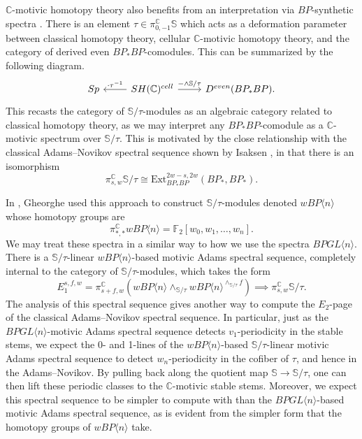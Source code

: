 \documentclass{amsart}
\theoremstyle{plain}
\numberwithin{theorem}{section}
\numberwithin{equation}{section}
\numberwithin{figure}{section}
\newcommand{\0}{\langle 0 \rangle }
\begin{document}
$\mathbb{C}$-motivic homotopy theory also benefits from an interpretation via $BP$-synthetic spectra \cite{Pst23}. There is an element $\tau \in \pi^{\mathbb{C}}_{0, -1}\mathbb{S}$ which acts as a deformation parameter between classical homotopy theory, cellular $\mathbb{C}$-motivic homotopy theory, and the category of derived even $BP_*BP$-comodules. This can be summarized by the following diagram. 
\[\begin{tikzcd}
	Sp & {SH(\mathbb{C})^{cell}} & {D^{even}(BP_*BP).}
	\arrow["{\cdot\tau^{-1}}"', from=1-2, to=1-1]
	\arrow["{-\wedge \mathbb{S}/\tau}", from=1-2, to=1-3]
\end{tikzcd}\]
This recasts the category of $\mathbb{S}/\tau$-modules as an algebraic category related to classical homotopy theory, as we may interpret any $BP_*BP$-comodule as a $\mathbb{C}$-motivic spectrum over $\mathbb{S}/\tau$. This is motivated by the close relationship with the classical Adams--Novikov spectral sequence shown by Isaksen \cite{Isaksen19}, in that there is an isomorphism
\[\pi_{s,w}^{\mathbb{C}}\mathbb{S}/\tau \cong \text{Ext}^{2w-s, 2w}_{BP_*BP}(BP_*, BP_*).\]

In \cite{Gheorghe18}, Gheorghe used this approach to construct $\mathbb{S}/\tau$-modules denoted $wBP\langle n \rangle$ whose homotopy groups are
\[\pi^{\mathbb{C}}_{*,*}wBP\langle n\rangle = \mathbb{F}_2[w_0, w_1, \dots, w_n].\]
We may treat these spectra in a similar way to how we use the spectra $BPGL \langle n \rangle$. There is a $\mathbb{S}/\tau$-linear $wBP\langle n \rangle$-based motivic Adams spectral sequence, completely internal to the category of $\mathbb{S}/\tau$-modules, which takes the form
\[E_1^{s,f,w} = \pi^{\mathbb{C}}_{s+f, w}(wBP\langle n \rangle \wedge_{\mathbb{S}/\tau} wBP\langle n \rangle^{\wedge_{\mathbb{S}/\tau}f}) \implies \pi^{\mathbb{C}}_{s,w}\mathbb{S}/\tau.\]
The analysis of this spectral sequence gives another way to compute the $E_2$-page of the classical Adams--Novikov spectral sequence. In particular, just as the $BPGL\langle n \rangle$-motivic Adams spectral sequence detects $v_1$-periodicity in the stable stems, we expect the 0- and 1-lines of the $wBP\langle n \rangle$-based $\mathbb{S}/\tau$-linear motivic Adams spectral sequence to detect $w_n$-periodicity in the cofiber of $\tau$, and hence in the Adams--Novikov. By pulling back along the quotient map $\mathbb{S} \to \mathbb{S}/\tau$, one can then lift these periodic classes to the $\mathbb{C}$-motivic stable stems. Moreover, we expect this spectral sequence to be simpler to compute with than the $BPGL \langle n \rangle$-based motivic Adams spectral sequence, as is evident from the simpler form that the homotopy groups of $wBP\langle n \rangle$ take.
\end{document}
